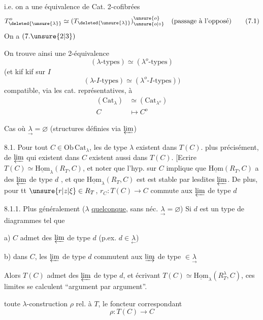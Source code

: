 i.e. on a une équivalence de Cat. 2-cofibrées
\[
T_{\deleted{\unsure{\lambda}}}^{o}\simeq(T_{\deleted{\unsure{\lambda}}})_{\unsure{o|\circ}}^{\unsure{o}}\quad\text{(passage à l'opposé)}\tag*{(7.1)}
\]
On a $(7.\unsure{2|3})$ \unsure{!}

On trouve ainsi une 2-équivalence
\[
(\lambda\text{-types})\simeq(\lambda^o\text{-types})\tag*{(7.3)}
\]
(et kif kif sur $I$
\[
(\lambda\text{-}I\text{-types})\simeq(\lambda^o\text{-}I\text{-types}))\tag*{(7.4.)}
\]
compatible, via les cat. représentatives, à
\[
\begin{aligned}
(\mathrm{Cat}_\lambda)&\simeq(\mathrm{Cat}_{\lambda^o})\\
C&\longmapsto C^o
\end{aligned}\tag*{(7.6)}
\]

 Cas où $\underset{\rightarrow}{\lambda}=\varnothing$ (structures définies via $\varprojlim$)

8.1. Pour tout $C\in\mathrm{Ob}\,\mathrm{Cat}_{\lambda}$, les \inserted{$\varprojlim$} de type $\lambda$ existent dans $T(C)$.
plus précisément,   de $\varprojlim$ qui existent dans $C$
existent aussi dans $T(C)$. [Ecrire $T(C)\simeq\underline{\mathrm{Hom}}_\lambda(R_T,C)$,
et noter que  l'hyp. sur $C$ implique que $\underline{\mathrm{Hom}}(R_T,C)$
 a des $\varprojlim$ de type $d$ , et que  $\underline{\mathrm{Hom}}_\lambda(R_T,C)$
est  est stable par lesdites $\varprojlim$. De plus, pour tt
$\unsure{r|z|\xi}\in R_T$,  $r_C:T(C)\longrightarrow C$ commute aux $\varprojlim$ de type $d$

8.1.1. Plus généralement ($\lambda$ \uline{quelconque}, sans néc. $\underset{\rightarrow}{\lambda}=\varnothing$)
Si  $d$  est un type de diagrammes tel que

a) $C$ admet des $\varprojlim$ de type $d$ (p.ex. $d\in\underset{\leftarrow}{\lambda}$)

b) dans $C$, les $\varprojlim$ de type $d$ commutent aux
$\varinjlim$ de type $\in\underset{\rightarrow}{\lambda}$

Alors  $T(C)$ admet des $\varprojlim$ de type $d$, et
 écrivant $T(C)\simeq\underline{\mathrm{Hom}}_\lambda(R_T^\lambda,C)$,
ces limites se calculent ``argument par argument''.


toute  $\lambda$-construction $\rho$ rel. à $T$, le foncteur
correspondant
\[
\rho:T(C)\longrightarrow C
\]
